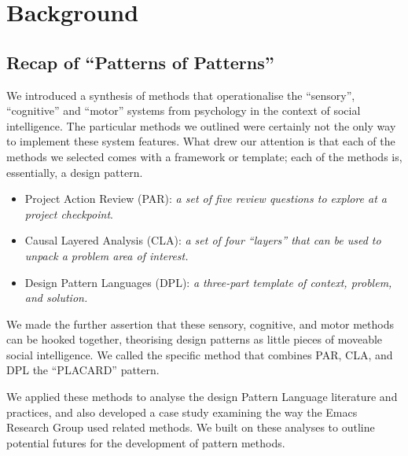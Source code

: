 \documentclass[acmlarge,timestamp]{acmart}
\begin{document}
\section{Background}
\subsection{Recap of “Patterns of Patterns”}
\label{sec:org7c32ecc}

We introduced a synthesis of methods that operationalise the
“sensory”, “cognitive” and “motor” systems from psychology in the context of social intelligence.  The particular methods we outlined were certainly not the only way to implement these system features.  What drew our attention is that each of the methods we selected comes with a framework or template; each of the methods is, essentially, a design pattern.

\begin{itemize}
\item Project Action Review (PAR): \emph{a set of five review questions to explore at a project checkpoint}.
\item Causal Layered Analysis (CLA): \emph{a set of four “layers” that can
be used to unpack a problem area of interest.}
\item Design Pattern Languages (DPL): \emph{a three-part
template of context, problem, and solution.}
\end{itemize}

We made the further assertion that these sensory, cognitive, and motor
methods can be hooked together, theorising design patterns as little
pieces of moveable social intelligence.  We called the specific method
that combines PAR, CLA, and DPL the “PLACARD” pattern.

We applied these methods to analyse the design Pattern Language
literature and practices, and also developed a case study examining
the way the Emacs Research Group used related methods.  We built on
these analyses to outline potential futures for the development of
pattern methods.
\end{document}
